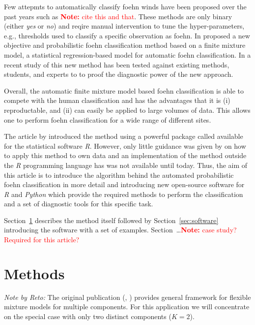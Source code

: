 \documentclass[article,nojss,shortnames]{jss}
\newcommand{\note}[1]{\textcolor{red}{\textbf{Note:} #1}}
\begin{document}
Few attepmts to automatically classify foehn winds have been proposed over the
past years such as \note{cite this and that}. These methods are only binary
(either \textit{yes} or \textit{no}) and reqire manual intervention to tune the
hyper-parameters, e.g., thresholds used to classify a specific observation as
foehn. In \citeyear{plavcan2014} \citeauthor{plavcan2014} proposed a new
objective and probabilistic foehn classification method based on a finite
mixture model, a statistical regression-based model for automatic foehn
classification. In a recent study of \cite{mayr2018unpublished} this new method
has been tested against existing methods, students, and experts to to proof the
diagnostic power of the new approach.

Overall, the automatic finite mixture model based foehn classification
\citep{plavcan2014} is able to compete with the human classification and 
has the advantages that it is (i) reproductable, and (ii) can easily be
applied to large volumes of data. This allows one to perform foehn classification
for a wide range of different sites.

The article by \citep{plavcan2014} introduced the method using a powerful
package called  \citep{leisch2004,gruen2007,gruen2008} available
for the statistical software \textit{R}.  However, only little guidance was
given by \citep{plavcan2014} on how to apply this method to own data and an
implementation of the method outside the \textit{R} programming language has
was not available until today.
Thus, the aim of this article is to introduce the algorithm behind the
automated probabilistic foehn classification \citep{plavcan2014} in more
detail and introducing new open-source software for \textit{R} and \textit{Python}
which provide the required methods to perform the classification and a set
of diagnostic tools for this specific task.

Section~\ref{sec:methods} describes the method itself followed by
Section~\ref{sec:software}  introducing the software with a set of
examples. Section~\dots \note{case study? Required for this article?}


\section{Methods}\label{sec:methods}

\textit{Note by Reto:}
The original publication (, \citealt{gruen2008})
provides general framework for flexible mixture models for multiple
components. For this application we will concentrate on the special
case with only two distinct components ($K = 2$).
\end{document}
